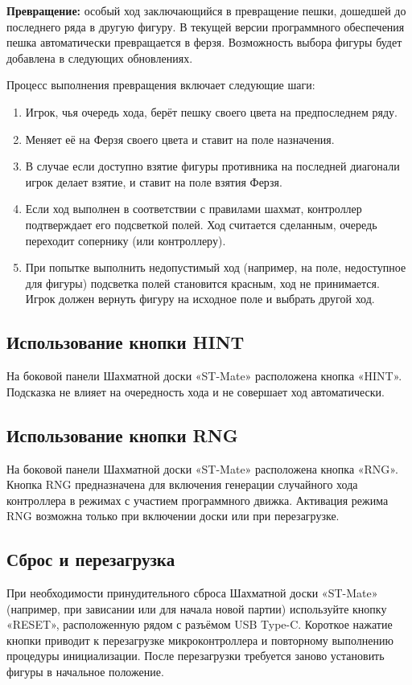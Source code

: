 \documentclass[a4paper,12pt]{article}
\begin{document}
\textbf{Превращение:} особый ход заключающийся в превращение пешки, дошедшей до последнего ряда в другую фигуру. 
В текущей версии программного обеспечения пешка автоматически превращается в ферзя. Возможность выбора фигуры будет добавлена в следующих обновлениях.

Процесс выполнения превращения включает следующие шаги:
\begin{enumerate}
    \item Игрок, чья очередь хода, берёт пешку своего цвета на предпоследнем ряду.
    \item Меняет её на Ферзя своего цвета и ставит на поле назначения.
    \item В случае если доступно взятие фигуры противника на последней диагонали игрок делает взятие, и ставит на поле взятия Ферзя.
    \item Если ход выполнен в соответствии с правилами шахмат, контроллер подтверждает его подсветкой полей. Ход считается сделанным, очередь переходит сопернику (или контроллеру).
    \item При попытке выполнить недопустимый ход (например, на поле, недоступное для фигуры) подсветка полей становится красным, ход не принимается. Игрок должен вернуть фигуру на исходное поле и выбрать другой ход.
\end{enumerate}

\subsection{Использование кнопки HINT}
На боковой панели Шахматной доски «ST-Mate» расположена кнопка «HINT».
Подсказка не влияет на очередность хода и не совершает ход автоматически.

\subsection{Использование кнопки RNG}
На боковой панели Шахматной доски «ST-Mate» расположена кнопка «RNG».
Кнопка RNG предназначена для включения генерации случайного хода контроллера в режимах с участием программного движка.
Активация режима RNG возможна только при включении доски или при перезагрузке.

\subsection{Сброс и перезагрузка}
При необходимости принудительного сброса Шахматной доски «ST-Mate» (например, при зависании или для начала новой партии) используйте кнопку «RESET», расположенную рядом с разъёмом USB Type-C. 
Короткое нажатие кнопки приводит к перезагрузке микроконтроллера и повторному выполнению процедуры инициализации. 
После перезагрузки требуется заново установить фигуры в начальное положение.
\end{document}
